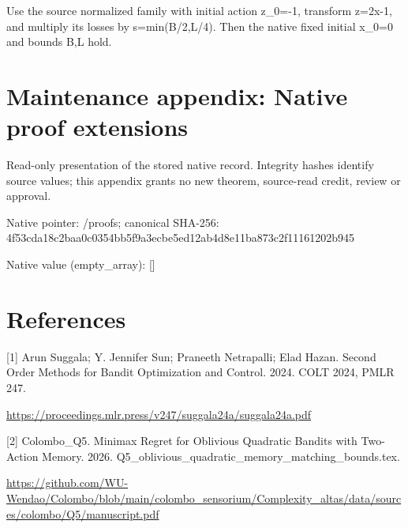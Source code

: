 \documentclass[10pt,a4paper]{article}
\begin{document}
Use the source normalized family with initial action z\_0=-1, transform z=2x-1, and multiply its losses by s=min(B/2,L/4). Then the native fixed initial x\_0=0 and bounds B,L hold.



\section{Maintenance appendix: Native proof extensions}


Read-only presentation of the stored native record. Integrity hashes identify source values; this appendix grants no new theorem, source-read credit, review or approval.



Native pointer: /proofs; canonical SHA-256: 4f53cda18c2baa0c0354bb5f\allowbreak{}9a3ecbe5ed12ab4d8e11ba87\allowbreak{}3c2f11161202b945



Native value (empty\_array): []



\section{References}


[1] Arun Suggala; Y. Jennifer Sun; Praneeth Netrapalli; Elad Hazan. Second Order Methods for Bandit Optimization and Control. 2024. COLT 2024, PMLR 247.



\url{https://proceedings.mlr.press/v247/suggala24a/suggala24a.pdf}



[2] Colombo\_Q5. Minimax Regret for Oblivious Quadratic Bandits with Two-Action Memory. 2026. Q5\_oblivious\_quadratic\_m\allowbreak{}emory\_matching\_bounds.te\allowbreak{}x.



\url{https://github.com/WU-Wendao/Colombo/blob/main/colombo_sensorium/Complexity_altas/data/sources/colombo/Q5/manuscript.pdf}
\end{document}
